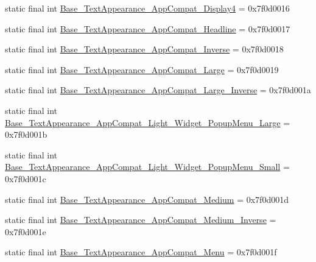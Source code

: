 \begin{DoxyCompactItemize}
\item 
static final int \mbox{\hyperlink{classcom_1_1synnapps_1_1carouselview_1_1_r_1_1style_a5c554bf6ea731f64675eba13412618ac}{Base\+\_\+\+Text\+Appearance\+\_\+\+App\+Compat\+\_\+\+Display4}} = 0x7f0d0016
\item 
static final int \mbox{\hyperlink{classcom_1_1synnapps_1_1carouselview_1_1_r_1_1style_afdba77335190bde51455086f6f5b47fd}{Base\+\_\+\+Text\+Appearance\+\_\+\+App\+Compat\+\_\+\+Headline}} = 0x7f0d0017
\item 
static final int \mbox{\hyperlink{classcom_1_1synnapps_1_1carouselview_1_1_r_1_1style_addd779b379f50475abd3b34b012b6a4f}{Base\+\_\+\+Text\+Appearance\+\_\+\+App\+Compat\+\_\+\+Inverse}} = 0x7f0d0018
\item 
static final int \mbox{\hyperlink{classcom_1_1synnapps_1_1carouselview_1_1_r_1_1style_a7b4c4c7c0dcb1fe19df490189843b245}{Base\+\_\+\+Text\+Appearance\+\_\+\+App\+Compat\+\_\+\+Large}} = 0x7f0d0019
\item 
static final int \mbox{\hyperlink{classcom_1_1synnapps_1_1carouselview_1_1_r_1_1style_ad77840b1e12532d2b5fbbfa0c8636c49}{Base\+\_\+\+Text\+Appearance\+\_\+\+App\+Compat\+\_\+\+Large\+\_\+\+Inverse}} = 0x7f0d001a
\item 
static final int \mbox{\hyperlink{classcom_1_1synnapps_1_1carouselview_1_1_r_1_1style_a94357efb815a81a95682564a36e9d069}{Base\+\_\+\+Text\+Appearance\+\_\+\+App\+Compat\+\_\+\+Light\+\_\+\+Widget\+\_\+\+Popup\+Menu\+\_\+\+Large}} = 0x7f0d001b
\item 
static final int \mbox{\hyperlink{classcom_1_1synnapps_1_1carouselview_1_1_r_1_1style_a82a70d51075ca75ce3ce837bb93552b3}{Base\+\_\+\+Text\+Appearance\+\_\+\+App\+Compat\+\_\+\+Light\+\_\+\+Widget\+\_\+\+Popup\+Menu\+\_\+\+Small}} = 0x7f0d001c
\item 
static final int \mbox{\hyperlink{classcom_1_1synnapps_1_1carouselview_1_1_r_1_1style_a289687501f7f3cbdce2b0d270decf0f3}{Base\+\_\+\+Text\+Appearance\+\_\+\+App\+Compat\+\_\+\+Medium}} = 0x7f0d001d
\item 
static final int \mbox{\hyperlink{classcom_1_1synnapps_1_1carouselview_1_1_r_1_1style_a67f15f8122c7ec8aeef4bcf77ed9032f}{Base\+\_\+\+Text\+Appearance\+\_\+\+App\+Compat\+\_\+\+Medium\+\_\+\+Inverse}} = 0x7f0d001e
\item 
static final int \mbox{\hyperlink{classcom_1_1synnapps_1_1carouselview_1_1_r_1_1style_a9f8569c55c1a2c6cb606d35a9176c694}{Base\+\_\+\+Text\+Appearance\+\_\+\+App\+Compat\+\_\+\+Menu}} = 0x7f0d001f
\item 

\end{DoxyCompactItemize}
